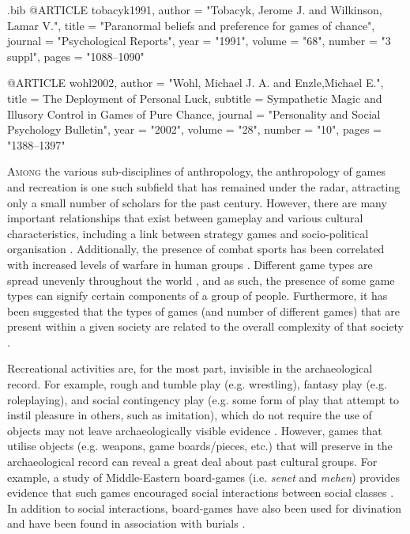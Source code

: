 \begin{filecontents}{\IJSRAidentifier.bib}
@ARTICLE {tobacyk1991,
	author  = "Tobacyk, Jerome J. and Wilkinson, Lamar V.",
	title   = "Paranormal beliefs and preference for games of chance",
	journal = "Psychological Reports",
	year    = "1991",
	volume  = "68",
	number  = "3 suppl",
	pages   = "1088--1090"
}

@ARTICLE {wohl2002,
	author  = "Wohl, Michael J. A. and Enzle,Michael E.",
	title   = {The Deployment of Personal Luck},
	subtitle = {Sympathetic Magic and Illusory Control in Games of Pure Chance},
	journal = "Personality and Social Psychology Bulletin",
	year    = "2002",
	volume  = "28",
	number  = "10",
	pages   = "1388--1397"
}
\end{filecontents}

%
\IJSRAopening%

\lettrine{A}{mong} the various sub-disciplines of anthropology, the anthropology of games and recreation is one such subfield that has remained under the radar, attracting only a small number of scholars for the past century. However, there are many important relationships that exist between gameplay and various cultural characteristics, including a link between strategy games and socio-political organisation \parencite[see][]{peregrine2008}. Additionally, the presence of combat sports has been correlated with increased levels of warfare in human groups \parencites[8]{chick2015}{sipes1973}. Different game types are spread unevenly throughout the world \parencites[309]{chick1984}{chick2015}{roberts1959}, and as such, the presence of some game types can signify certain components of a group of people. Furthermore, it has been suggested that the types of games (and number of different games) that are present within a given society are related to the overall complexity of that society \parencites[313]{chick1984}{roberts1959}.

Recreational activities are, for the most part, invisible in the archaeological record. For example, rough and tumble play (e.g. wrestling), fantasy play (e.g. roleplaying), and social contingency play (e.g. some form of play that attempt to instil pleasure in others, such as imitation), which do not require the use of objects may not leave archaeologically visible evidence \parencite[218-19]{gosso2005}. However, games that utilise objects (e.g. weapons, game boards/pieces, etc.) that will preserve in the archaeological record can reveal a great deal about past cultural groups. For example, a study of Middle-Eastern board-games (i.e. \textit{senet} and \textit{mehen}) provides evidence that such games encouraged social interactions between social classes \parencite{crist2016}. In addition to social interactions, board-games have also been used for divination \parencite[25]{finkel2007} and have been found in association with burials \parencite[440]{hall2016}.

